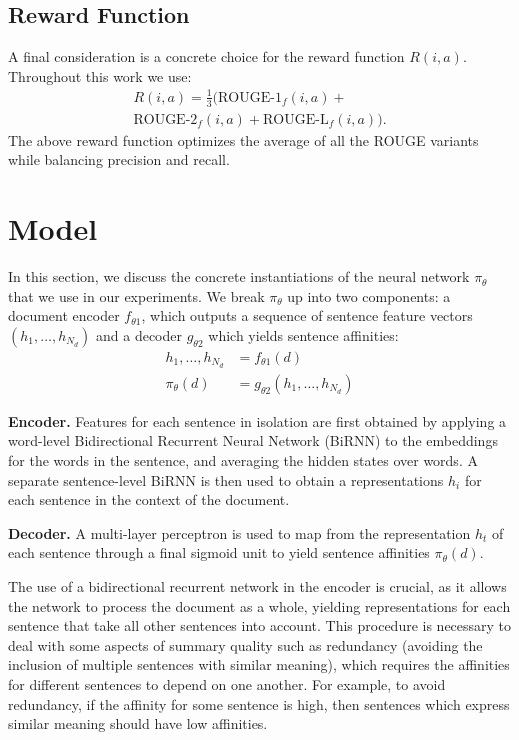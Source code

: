 \documentclass[11pt,a4paper]{article}
\begin{document}
\subsection{Reward Function}
A final consideration is a concrete choice for the reward function $R(i, a)$. Throughout this work we use:
\begin{multline}
R(i, a) = \frac{1}{3} (\text{ROUGE-1}_f(i, a) + {} \\
                     \text{ROUGE-2}_f(i, a) + 
                     \text{ROUGE-L}_f(i, a)).
\end{multline}
The above reward function optimizes the average of all the ROUGE variants \cite{eva1_lin:2004:ACLsummarization} while balancing precision and recall. 


\section{Model\label{sec:model}}
In this section, we discuss the concrete instantiations of the neural network $\pi_\theta$ that we use in our experiments. We break $\pi_\theta$ up into two components: a document encoder $f_{\theta1}$, which outputs a sequence of sentence feature vectors $(h_1, \dots, h_{N_d})$ and a decoder $g_{\theta2}$ which yields sentence affinities:
\begin{align}
    h_1, \dots, h_{N_d} &= f_{\theta1}(d)\\
    \pi_\theta(d) &= g_{\theta2}(h_1, \dots, h_{N_d})
\end{align}


\noindent \textbf{Encoder.} Features for each sentence in isolation are first obtained by applying a word-level Bidirectional Recurrent Neural Network (BiRNN) to the embeddings for the words in the sentence, and averaging the hidden states over words. A separate sentence-level BiRNN is then used to obtain a representations $h_i$ for each sentence in the context of the document.



\noindent \textbf{Decoder.} A multi-layer perceptron is used to map from the representation $h_t$ of each sentence through a final sigmoid unit to yield sentence affinities $\pi_\theta(d)$.

The use of a bidirectional recurrent network in the encoder is crucial, as it allows the network to process the document as a whole, yielding representations for each sentence that take all other sentences into account. This procedure is necessary to deal with some aspects of summary quality such as redundancy (avoiding the inclusion of multiple sentences with similar meaning), which requires the affinities for different sentences to depend on one another. For example, to avoid redundancy, if the affinity for some sentence is high, then sentences which express similar meaning should have low affinities.
\end{document}
